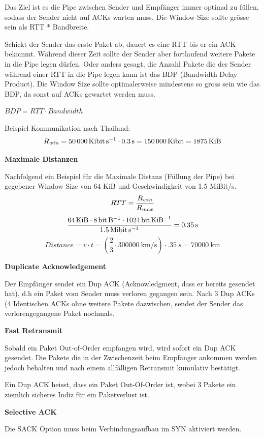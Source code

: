 Das Ziel ist es die Pipe zwischen Sender und Empfänger immer optimal zu füllen,
sodass der Sender nicht auf ACKs warten muss. Die Window Size sollte grösse
sein als RTT * Bandbreite.

Schickt der Sender das erste Paket ab, dauert es eine RTT bis er ein ACK
bekommt. Während dieser Zeit sollte der Sender aber fortlaufend weitere Pakete
in die Pipe legen dürfen. Oder anders gesagt, die Anzahl Pakete die der Sender
während einer RTT in die Pipe legen kann ist das BDP (Bandwidth Delay Product).
Die Window Size sollte optimalerweise mindestens so gross sein wie das BDP, da
sonst auf ACKs gewartet werden muss.

$BDP=RTT \cdot Bandwidth$

Beispiel Kommunikation nach Thailand:
\[
	R_{win} = \SI{50000}{\kibi\bit\per\second} \cdot \SI{.3}{\second} = \SI{150000}{\kibi\bit} = \SI{1875}{\kibi\byte}
\]

\textbf{Maximale Distanzen}

Nachfolgend ein Beispiel für die Maximale Distanz (Füllung der Pipe) bei
gegebener Window Size von 64 KiB und Geschwindigkeit von 1.5 MiBit/s.
\[
	RTT = \frac{R_{win}}{R_{max}}\\
\]
\[
	\frac{\SI{64}{\kibi\byte} \cdot \SI{8}{\bit\per\byte} \cdot
	\SI{1024}{\bit\per\kibi\byte}}{\SI{1.5}{\mebi\bit\per\second}} = \SI{.35}{s}
\]
\[
	Distance = v \cdot t =\left(\frac{2}{3} \cdot \SI{300000}{\kilo\meter\per\second}\right)\cdot \SI{.35}{s} = \SI{70000}{\kilo\meter}
\]

\textbf{Duplicate Acknowledgement}

Der Empfänger sendet ein Dup ACK (Acknowledgment, dass er bereits gesendet hat),
d.h ein Paket vom Sender muss verloren gegangen sein. Nach 3 Dup ACKs (4
Identischen ACKs ohne weitere Pakete dazwischen, sendet der Sender das
verlorengegangene Paket nochmals.

\textbf{Fast Retransmit}

Sobald ein Paket Out-of-Order empfangen wird, wird sofort ein Dup ACK gesendet.
Die Pakete die in der Zwischenzeit beim Empfänger ankommen werden jedoch
behalten und nach einem allfälligen Retransmit kumulativ bestätigt.

Ein Dup ACK heisst, dass ein Paket Out-Of-Order ist, wobei 3 Pakete ein ziemlich
sicheres Indiz für ein Paketverlust ist.

\textbf{Selective ACK}

Die SACK Option muss beim Verbindungsaufbau im SYN aktiviert werden. 

